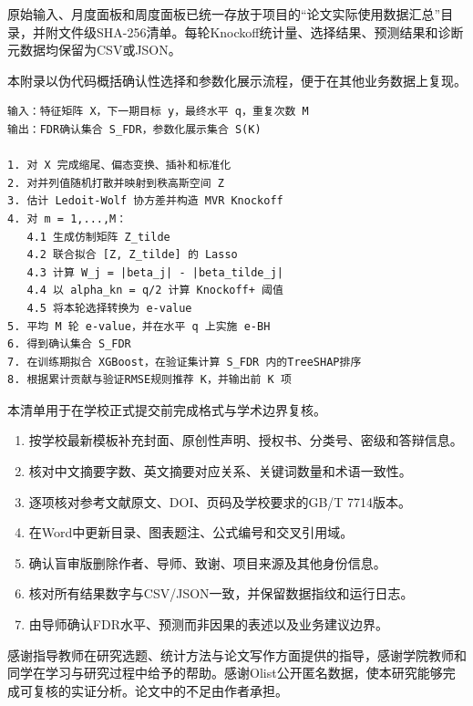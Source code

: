 \documentclass{sufethesismas}
\providecommand{\tightlist}{\setlength{\itemsep}{0pt}\setlength{\parskip}{0pt}}
\begin{document}
原始输入、月度面板和周度面板已统一存放于项目的``论文实际使用数据汇总''目录，并附文件级SHA-256清单。每轮Knockoff统计量、选择结果、预测结果和诊断元数据均保留为CSV或JSON。


本附录以伪代码概括确认性选择和参数化展示流程，便于在其他业务数据上复现。

\begin{verbatim}
输入：特征矩阵 X，下一期目标 y，最终水平 q，重复次数 M
输出：FDR确认集合 S_FDR，参数化展示集合 S(K)

1. 对 X 完成缩尾、偏态变换、插补和标准化
2. 对并列值随机打散并映射到秩高斯空间 Z
3. 估计 Ledoit-Wolf 协方差并构造 MVR Knockoff
4. 对 m = 1,...,M：
   4.1 生成仿制矩阵 Z_tilde
   4.2 联合拟合 [Z, Z_tilde] 的 Lasso
   4.3 计算 W_j = |beta_j| - |beta_tilde_j|
   4.4 以 alpha_kn = q/2 计算 Knockoff+ 阈值
   4.5 将本轮选择转换为 e-value
5. 平均 M 轮 e-value，并在水平 q 上实施 e-BH
6. 得到确认集合 S_FDR
7. 在训练期拟合 XGBoost，在验证集计算 S_FDR 内的TreeSHAP排序
8. 根据累计贡献与验证RMSE规则推荐 K，并输出前 K 项
\end{verbatim}


本清单用于在学校正式提交前完成格式与学术边界复核。

\begin{enumerate}
\def\labelenumi{\arabic{enumi}.}
\tightlist
\item
  按学校最新模板补充封面、原创性声明、授权书、分类号、密级和答辩信息。
\item
  核对中文摘要字数、英文摘要对应关系、关键词数量和术语一致性。
\item
  逐项核对参考文献原文、DOI、页码及学校要求的GB/T 7714版本。
\item
  在Word中更新目录、图表题注、公式编号和交叉引用域。
\item
  确认盲审版删除作者、导师、致谢、项目来源及其他身份信息。
\item
  核对所有结果数字与CSV/JSON一致，并保留数据指纹和运行日志。
\item
  由导师确认FDR水平、预测而非因果的表述以及业务建议边界。
\end{enumerate}

感谢指导教师在研究选题、统计方法与论文写作方面提供的指导，感谢学院教师和同学在学习与研究过程中给予的帮助。感谢Olist公开匿名数据，使本研究能够完成可复核的实证分析。论文中的不足由作者承担。
\end{document}
